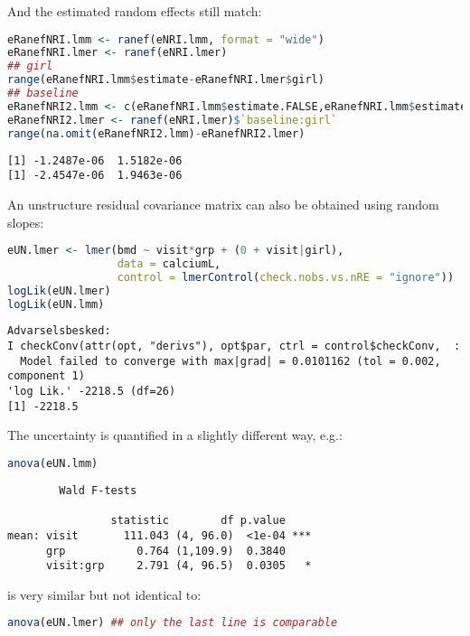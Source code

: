 \documentclass[12pt]{article}
\begin{document}
And the estimated random effects still match:
\begin{lstlisting}[language=r,numbers=none]
eRanefNRI.lmm <- ranef(eNRI.lmm, format = "wide")
eRanefNRI.lmer <- ranef(eNRI.lmer)
## girl
range(eRanefNRI.lmm$estimate-eRanefNRI.lmer$girl)
## baseline
eRanefNRI2.lmm <- c(eRanefNRI.lmm$estimate.FALSE,eRanefNRI.lmm$estimate.TRUE)
eRanefNRI2.lmer <- ranef(eNRI.lmer)$`baseline:girl`
range(na.omit(eRanefNRI2.lmm)-eRanefNRI2.lmer)
\end{lstlisting}

\label{}
\begin{verbatim}
[1] -1.2487e-06  1.5182e-06
[1] -2.4547e-06  1.9463e-06
\end{verbatim}


\clearpage

An unstructure residual covariance matrix can also be obtained using
random slopes:
\begin{lstlisting}[language=r,numbers=none]
eUN.lmer <- lmer(bmd ~ visit*grp + (0 + visit|girl),
                 data = calciumL,
                 control = lmerControl(check.nobs.vs.nRE = "ignore"))
logLik(eUN.lmer)
logLik(eUN.lmm)
\end{lstlisting}

\label{}
\begin{verbatim}
Advarselsbesked:
I checkConv(attr(opt, "derivs"), opt$par, ctrl = control$checkConv,  :
  Model failed to converge with max|grad| = 0.0101162 (tol = 0.002, component 1)
'log Lik.' -2218.5 (df=26)
[1] -2218.5
\end{verbatim}


The uncertainty is quantified in a slightly different way, e.g.:
\begin{lstlisting}[language=r,numbers=none]
anova(eUN.lmm)
\end{lstlisting}

\label{}
\begin{verbatim}
		Wald F-tests 

                statistic        df p.value    
mean: visit       111.043 (4, 96.0)  <1e-04 ***
      grp           0.764 (1,109.9)  0.3840    
      visit:grp     2.791 (4, 96.5)  0.0305   *
\end{verbatim}


is very similar but not identical to:
\begin{lstlisting}[language=r,numbers=none]
anova(eUN.lmer) ## only the last line is comparable
\end{lstlisting}
\end{document}
